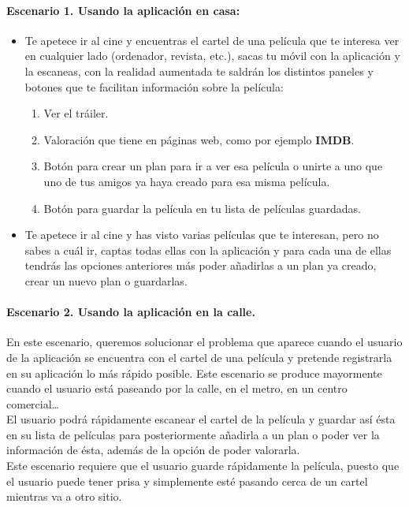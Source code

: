 \paragraph{Escenario 1. Usando la aplicación en casa:\\}
\begin{itemize}
    \item Te apetece ir al cine y encuentras el cartel de una película que te interesa ver en cualquier lado (ordenador, revista, etc.), sacas tu móvil con la aplicación y 
    la escaneas, con la realidad aumentada te saldrán los distintos paneles y botones que te facilitan información sobre la película:
    \begin{enumerate}
        \item Ver el tráiler.
        \item Valoración que tiene en páginas web, como por ejemplo \textbf{IMDB}.
        \item Botón para crear un plan para ir a ver esa película o unirte a uno que uno de tus amigos ya haya creado para esa misma película.
        \item Botón para guardar la película en tu lista de películas guardadas.
    \end{enumerate}
    \item Te apetece ir al cine y has visto varias películas que te interesan, pero no sabes a cuál ir, captas todas ellas con la aplicación 
    y para cada una de ellas tendrás las opciones anteriores más poder añadirlas a un plan ya creado, crear un nuevo plan o guardarlas.
\end{itemize}
\newpage
\paragraph{Escenario 2. Usando la aplicación en la calle.\\}
En este escenario, queremos solucionar el problema que aparece cuando el usuario de la aplicación se encuentra con el cartel de una película y pretende registrarla en su aplicación lo más rápido posible.
Este escenario se produce mayormente cuando el usuario está paseando por la calle, en el metro, en un centro comercial…
\\
El usuario podrá rápidamente escanear el cartel de la película y guardar así ésta en su lista de películas para posteriormente añadirla a un plan o poder ver la información de ésta, además de la opción de poder valorarla.
\\
Este escenario requiere que el usuario guarde rápidamente la película, puesto que el usuario puede tener prisa y simplemente esté pasando cerca de un cartel mientras va a otro sitio.




